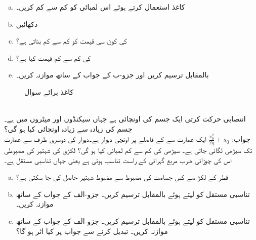\begin{enumerate}[a.]
\item
کاغذ استعمال کرتے ہوئے اس لمبائی کو کم سے کم کریں۔
\item
دکھائیں 
\item
{} کی کون سی قیمت  کو کم سے کم بناتی ہے؟
\item
{} کی کم سے کم قیمت کیا ہے؟
\item
{} بالمقابل  ترسیم کریں اور جزو-ب کے جواب کے ساتھ موازنہ کریں۔
\end{enumerate}
\begin{figure}
\centering
{}
\caption{کاغذ برائے سوال }
\label{شکل_سوال_استعمال_کاغذ}
\end{figure}
\\
انتصابی حرکت کرتی ایک جسم کی اونچائی   ہے جہاں  سیکنڈوں اور  میٹروں میں ہے۔جسم کی زیادہ سے زیادہ اونچائی کیا ہو گی؟\\
جواب:\quad
$\tfrac{v_0^2}{2g}+s_0$
ایک عمارت سے  کے فاصلے پر  اونچی دیوار ہے۔دیوار کی دوسری طرف سے عمارت تک سیڑھی لگائی جاتی ہے۔ سیڑھی کی کم سے کم لمبائی کیا ہو گی؟ 
\quad
لکڑی کی شہتیر کی مضبوطی  اس کی چوڑائی  ضرب مربع گہرائی  کے راست تناسب ہوتی ہے یعنی  جہاں  تناسبی مستقل ہے۔
\begin{enumerate}[a.]
\item
{} قطر کے لکڑ سے  کس جسامت کی مضبوط سے مضبوط شہتیر حاصل کی جا سکتی ہے؟  
\item
تناسبی مستقل کو  لیتے ہوئے  بالمقابل  ترسیم کریں۔ جزو-الف کے جواب کے ساتھ موازنہ کریں۔
\item
تناسبی مستقل کو  لیتے ہوئے  بالمقابل  ترسیم کریں۔ جزو-الف کے جواب کے ساتھ موازنہ کریں۔   تبدیل کرنے سے جواب پر کیا اثر ہو گا؟
\end{enumerate}
